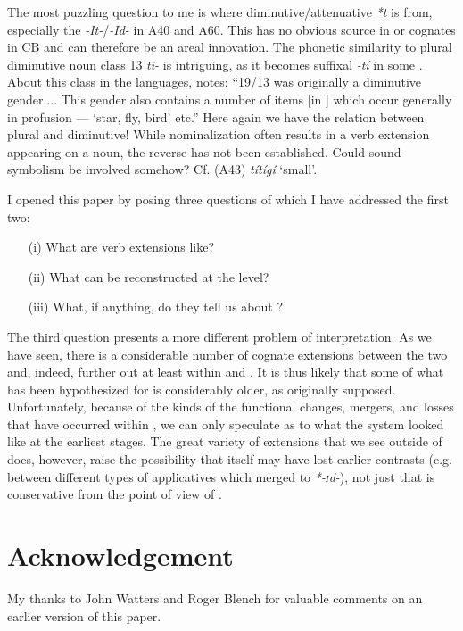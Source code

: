 \documentclass[output=paper]{langsci/langscibook}
\begin{document}
The most puzzling question to me is where diminutive/attenuative \textit{*t} is from, especially the \textit{-It-}/\textit{-Id-} in A40 and A60. This has no obvious source in  or cognates in CB and can therefore be an areal innovation. The phonetic similarity to plural diminutive noun class 13 \textit{ti-} is intriguing, as it becomes suffixal \textit{-tí} in some . About this class in the  languages, \citet[209]{Stallcup1980momo} notes: “19/13 was originally a diminutive gender.... This gender also contains a number of items [in ] which occur generally in profusion — ‘star, fly, bird’ etc.” Here again we have the relation between plural and diminutive! While nominalization often results in a verb extension appearing on a noun, the reverse has not been established. Could sound symbolism be involved somehow? Cf.  (A43) \textit{títígí} ‘small’.

I opened this paper by posing three questions of which I have addressed the first two: 
\begin{itemize}
\item[(i)]  What are  verb extensions like? 
\item[(ii)] What can be reconstructed at the  level? 
\item[(iii)] What, if anything, do they tell us about ?
\end{itemize}
 The third question presents a more different problem of interpretation. As we have seen, there is a considerable number of cognate extensions between the two and, indeed, further out at least within  and . It is thus likely that some of what has been hypothesized for  is considerably older, as \citet{Voeltz1977} originally supposed. Unfortunately, because of the kinds of the functional changes, mergers, and losses that have occurred within , we can only speculate as to what the system looked like at the earliest stages. The great variety of extensions that we see outside of  does, however, raise the possibility that  itself may have lost earlier contrasts (e.g. between different types of applicatives which merged to \textit{*-ɪd-}), not just that  is conservative from the point of view of .

\section*{Acknowledgement}
My thanks to John Watters and Roger Blench for valuable comments on an earlier version of this paper.
  

{\sloppy
\printbibliography[heading=subbibliography,notkeyword=this]
}
 
\end{document}
